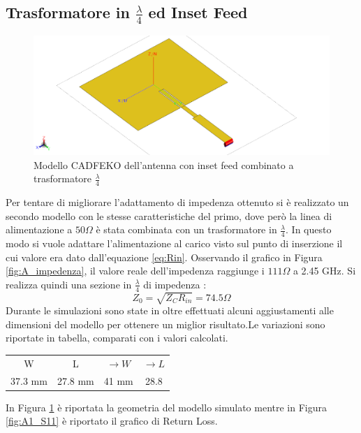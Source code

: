 \documentclass[twoside,twocolumn]{article}
\begin{document}
\subsection*{Trasformatore in $\frac{\lambda}{4}$ ed Inset Feed }
 \begin{figure}[h!]
  \includegraphics[width=\linewidth]{A1_Cad.png}
  \caption{Modello CADFEKO dell'antenna con inset feed combinato a trasformatore $\frac{\lambda}{4}$}
  \label{fig:A1_Cad}
\end{figure}
Per tentare di migliorare l'adattamento di impedenza ottenuto si è realizzato un secondo modello con le stesse caratteristiche del primo, dove però la linea di alimentazione a $50\Omega$ è stata combinata con un trasformatore in $\frac{\lambda}{4}$.
In questo modo si vuole adattare l'alimentazione al carico visto sul punto di inserzione il cui valore era dato dall'equazione \ref{eq:Rin}. \newline Osservando il grafico in Figura \ref{fig:A_impedenza}, il valore reale dell'impedenza raggiunge i $111 \Omega$ a 2.45 GHz. Si realizza quindi una sezione  in $\frac{\lambda}{4}$ di impedenza :
\begin{equation}
Z_{0}=\sqrt{Z_{C}R_{in}}=74.5 \Omega
\end{equation}
Durante le simulazioni sono state in oltre effettuati alcuni aggiustamenti alle dimensioni del modello  per ottenere un miglior risultato.Le variazioni sono riportate in tabella, comparati con i valori calcolati.
\begin{center}
\begin{tabular}{ |c|c|c|c| } 
 \hline
 W & L & $\rightarrow W$ & $\rightarrow L$\\ 
 37.3 mm& 27.8 mm & 41 mm & 28.8 \\ 
 \hline
\end{tabular}
\end{center}
In Figura \ref{fig:A1_Cad} è riportata la geometria del modello simulato mentre in Figura \ref{fig:A1_S11} è riportato il grafico di Return Loss.
\end{document}

